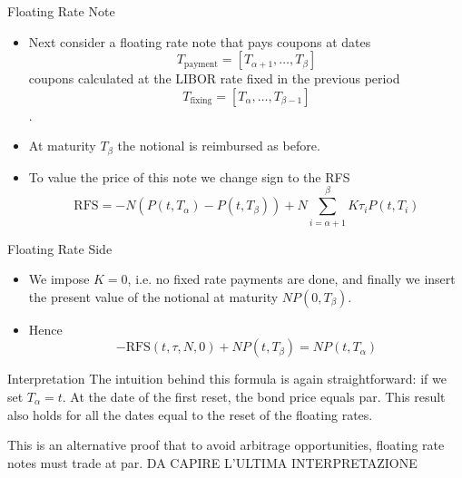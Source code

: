 \documentclass{beamer}
\begin{document}
\begin{frame}{Floating Rate Note}
	\begin{itemize}
		\item Next consider a floating rate note that pays coupons at dates
		\begin{equation*}
			T_{\text{payment}} = [T_{\alpha+1},\ldots,T_\beta]
		\end{equation*}
		coupons calculated at the LIBOR rate fixed in the previous period
		\begin{equation*}
			T_{\text{fixing}} = [T_{\alpha},\ldots,T_{\beta - 1}]
		\end{equation*}.
		\item At maturity $T_\beta$ the notional is reimbursed as before.
		\item To value the price of this note we change sign to the RFS
		\begin{equation*}
			\text{RFS} = -N(P(t,T_\alpha)-P(t,T_\beta))+N\sum_{i=\alpha+1}^{\beta}K\tau_i P(t,T_i)
		\end{equation*}
	\end{itemize}
\end{frame}

\begin{frame}{Floating Rate Side}
	\begin{itemize}
		\item We impose $K=0$, i.e. no fixed rate payments are done, and finally we insert the present value of the notional at maturity $NP(0,T_\beta)$.
		\item Hence
		\begin{equation}
			-\text{RFS}(t,\tau,N,0) + NP(t,T_\beta) = NP(t,T_\alpha)
		\end{equation}
	\end{itemize}
	\begin{block}{Interpretation}
		The intuition behind this formula is again straightforward: if we set $T_\alpha =t$. At the date of the first reset, the bond price equals par. This result also holds for all the dates equal to the reset of the floating rates. 
	\end{block}
	This is an alternative proof that to avoid arbitrage opportunities, floating rate notes must trade at par.
	DA CAPIRE L'ULTIMA INTERPRETAZIONE
\end{frame}
\end{document}
